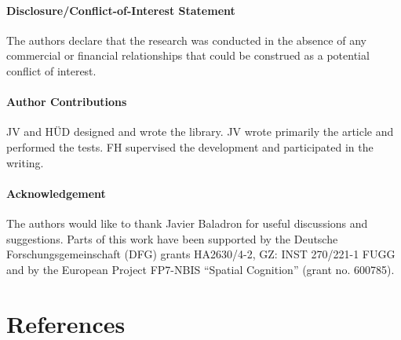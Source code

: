 \documentclass[
  11pt,
  a4paper,
]{scrbook}
\begin{document}
\subsubsection*{Disclosure/Conflict-of-Interest
Statement}\label{disclosureconflict-of-interest-statement-1}

The authors declare that the research was conducted in the absence of
any commercial or financial relationships that could be construed as a
potential conflict of interest.

\subsubsection*{Author Contributions}\label{author-contributions}

JV and HÜD designed and wrote the library. JV wrote primarily the
article and performed the tests. FH supervised the development and
participated in the writing.

\subsubsection*{Acknowledgement}\label{acknowledgement-1}

The authors would like to thank Javier Baladron for useful discussions
and suggestions. Parts of this work have been supported by the Deutsche
Forschungsgemeinschaft (DFG) grants HA2630/4-2, GZ: INST 270/221-1 FUGG
and by the European Project FP7-NBIS ``Spatial Cognition'' (grant no.
600785).


\chapter*{References}\label{references}

\end{document}
